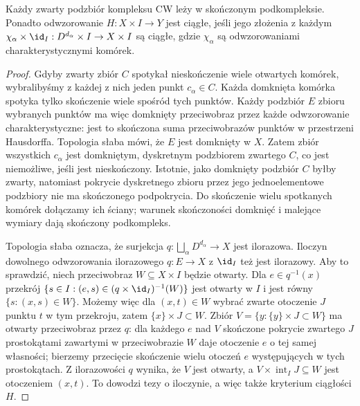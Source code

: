 \begin{lemat}
\label{lem:zwartosc-cw-pi}
Każdy zwarty podzbiór kompleksu CW leży w skończonym podkompleksie.
Ponadto odwzorowanie $H:X\times I\to Y$ jest ciągłe, jeśli jego złożenia
z każdym $\chi_\alpha\times\id_I:D^{d_\alpha}\times I\to X\times I$
są ciągłe, gdzie $\chi_\alpha$ są odwzorowaniami charakterystycznymi komórek.
\end{lemat}
\begin{proof}
Gdyby zwarty zbiór $C$ spotykał nieskończenie wiele otwartych komórek,
wybralibyśmy z każdej z nich jeden punkt $c_\alpha\in C$.
Każda domknięta komórka spotyka tylko skończenie wiele spośród tych punktów.
Każdy podzbiór $E$ zbioru wybranych punktów ma więc domknięty
przeciwobraz przez każde odwzorowanie charakterystyczne: jest to skończona
suma przeciwobrazów punktów w przestrzeni Hausdorffa.
Topologia słaba mówi, że $E$ jest domknięty w $X$.
Zatem zbiór wszystkich $c_\alpha$ jest domkniętym, dyskretnym
podzbiorem zwartego $C$, co jest niemożliwe, jeśli jest nieskończony.
Istotnie, jako domknięty podzbiór $C$ byłby zwarty, natomiast
pokrycie dyskretnego zbioru przez jego jednoelementowe podzbiory
nie ma skończonego podpokrycia.
Do skończenie wielu spotkanych komórek dołączamy ich ściany;
warunek skończoności domknięć i malejące wymiary dają skończony podkompleks.

Topologia słaba oznacza, że surjekcja
$q:\bigsqcup_\alpha D^{d_\alpha}\to X$ jest ilorazowa.
Iloczyn dowolnego odwzorowania ilorazowego $q:E\to X$ z $\id_I$ też jest ilorazowy.
Aby to sprawdzić, niech przeciwobraz $W\subseteq X\times I$ będzie otwarty.
Dla $e\in q^{-1}(x)$ przekrój
$\{s\in I:(e,s)\in(q\times\id_I)^{-1}(W)\}$ jest otwarty w $I$
i jest równy $\{s:(x,s)\in W\}$.
Możemy więc dla $(x,t)\in W$ wybrać zwarte otoczenie $J$ punktu $t$
w tym przekroju, zatem $\{x\}\times J\subset W$. Zbiór
$V=\{y:\{y\}\times J\subset W\}$ ma otwarty przeciwobraz przez $q$:
dla każdego $e$ nad $V$ skończone pokrycie zwartego $J$
prostokątami zawartymi w przeciwobrazie $W$ daje otoczenie $e$
o tej samej własności; bierzemy przecięcie skończenie wielu
otoczeń $e$ występujących w tych prostokątach.
Z ilorazowości $q$ wynika, że $V$ jest otwarty, a
$V\times\operatorname{int}_I J\subseteq W$ jest otoczeniem $(x,t)$.
To dowodzi tezy o iloczynie, a więc także kryterium ciągłości $H$.
\end{proof}

